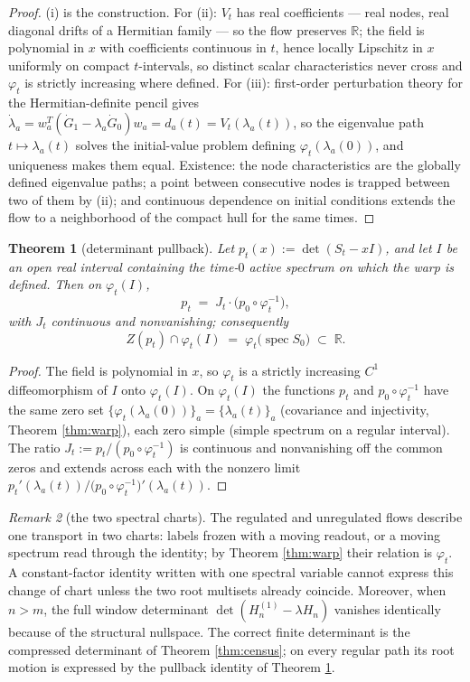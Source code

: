 \documentclass[11pt]{article}
\theoremstyle{plain}
\newtheorem{theorem}{Theorem}
\theoremstyle{definition}
\theoremstyle{remark}
\newtheorem{remark}[theorem]{Remark}
\newcommand{\R}{\mathbb{R}}
\DeclareMathOperator{\spec}{spec}
\begin{document}
\begin{proof}
(i) is the construction. For (ii): $V_t$ has real coefficients --- real nodes, real
diagonal drifts of a Hermitian family --- so the flow preserves $\R$; the field is
polynomial in $x$ with coefficients continuous in $t$, hence locally Lipschitz in $x$
uniformly on compact $t$-intervals, so distinct scalar characteristics never cross and
$\varphi_t$ is strictly increasing where defined. For (iii): first-order perturbation
theory for the Hermitian-definite pencil gives
$\dot\lambda_a=w_a^{T}(\dot G_1-\lambda_a\dot G_0)w_a=d_a(t)=V_t(\lambda_a(t))$, so the
eigenvalue path $t\mapsto\lambda_a(t)$ solves the initial-value problem defining
$\varphi_t(\lambda_a(0))$, and uniqueness makes them equal. Existence: the node
characteristics are the globally defined eigenvalue paths; a point between consecutive
nodes is trapped between two of them by (ii); and continuous dependence on initial
conditions extends the flow to a neighborhood of the compact hull for the same times.
\end{proof}

\begin{theorem}[determinant pullback]\label{thm:pullback}
Let $p_t(x):=\det(S_t-xI)$, and let $I$ be an open real interval containing the
time-$0$ active spectrum on which the warp is defined. Then on $\varphi_t(I)$,
\[
  p_t \;=\; J_t\cdot\bigl(p_0\circ\varphi_t^{-1}\bigr),
\]
with $J_t$ continuous and nonvanishing; consequently
\[
  Z(p_t)\cap\varphi_t(I)\;=\;\varphi_t\bigl(\spec S_0\bigr)\;\subset\;\R .
\]
\end{theorem}

\begin{proof}
The field is polynomial in $x$, so $\varphi_t$ is a strictly increasing $C^1$
diffeomorphism of $I$ onto $\varphi_t(I)$. On $\varphi_t(I)$ the functions $p_t$ and
$p_0\circ\varphi_t^{-1}$ have the same zero set
$\{\varphi_t(\lambda_a(0))\}_a=\{\lambda_a(t)\}_a$ (covariance and injectivity,
Theorem \ref{thm:warp}), each zero simple (simple spectrum on a regular interval). The
ratio $J_t:=p_t/(p_0\circ\varphi_t^{-1})$ is continuous and nonvanishing off the common
zeros and extends across each with the nonzero limit
$p_t'(\lambda_a(t))\big/\bigl(p_0\circ\varphi_t^{-1}\bigr)'(\lambda_a(t))$.
\end{proof}

\begin{remark}[the two spectral charts]\label{rem:architectures}
The regulated and unregulated flows describe one transport in two charts: labels frozen
with a moving readout, or a moving spectrum read through the identity; by Theorem
\ref{thm:warp} their relation is $\varphi_t$. A constant-factor identity written with
one spectral variable cannot express this change of chart unless the two root multisets
already coincide. Moreover, when $n>m$, the full window determinant
$\det(H_n^{(1)}-\lambda H_n)$ vanishes identically because of the structural nullspace.
The correct finite determinant is the compressed determinant of Theorem
\ref{thm:census}; on every regular path its root motion is expressed by the pullback
identity of Theorem \ref{thm:pullback}.
\end{remark}
\end{document}

